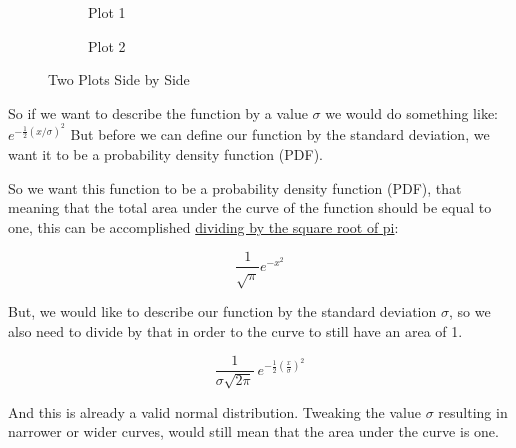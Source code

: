 \documentclass[11pt]{article}
\begin{document}
\begin{figure}
  \centering
  \begin{subfigure}[b]{0.45\textwidth}
    \caption{Plot 1}
    \label{fig:plot1}
  \end{subfigure}
  \hfill
  \begin{subfigure}[b]{0.45\textwidth}
    \caption{Plot 2}
    \label{fig:plot2}
  \end{subfigure}
  \caption{Two Plots Side by Side}
  \label{fig:plots}
\end{figure}

So if we want to describe the function by a value \(\sigma\) we would do
something like: \(e^{-\frac{1}{2}(x/\sigma)^2}\) But before we can
define our function by the standard deviation, we want it to be a
probability density function (PDF).

So we want this function to be a probability density function (PDF),
that meaning that the total area under the curve of the function should
be equal to one, this can be accomplished
\href{https://youtu.be/cy8r7WSuT1I}{dividing by the square root of
pi}:

$$\frac{1}{\sqrt\pi} e^{-x^2}$$

But, we would like to describe our function by the standard deviation
\(\sigma\), so we also need to divide by that in order to the curve to
still have an area of 1.

$$ \frac{1}{\sigma \sqrt{2\pi}} \ e^{-\frac{1}{2} \left (\frac{x}{\sigma} \right)^2} $$

And this is already a valid normal distribution. Tweaking the value
\(\sigma\) resulting in narrower or wider curves, would still mean that
the area under the curve is one.
\end{document}
